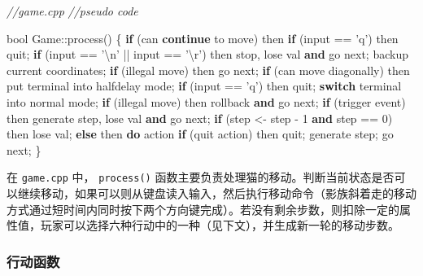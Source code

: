 \documentclass[hyperref,UTF8,a4paper]{ctexart}
\newenvironment{Shaded}{}{}
\newcommand{\CharTok}[1]{\textcolor[rgb]{0.25,0.44,0.63}{#1}}
\newcommand{\CommentTok}[1]{\textcolor[rgb]{0.38,0.63,0.69}{\textit{#1}}}
\newcommand{\ControlFlowTok}[1]{\textcolor[rgb]{0.00,0.44,0.13}{\textbf{#1}}}
\newcommand{\DataTypeTok}[1]{\textcolor[rgb]{0.56,0.13,0.00}{#1}}
\newcommand{\DecValTok}[1]{\textcolor[rgb]{0.25,0.63,0.44}{#1}}
\newcommand{\KeywordTok}[1]{\textcolor[rgb]{0.00,0.44,0.13}{\textbf{#1}}}
\newcommand{\NormalTok}[1]{#1}
\newcommand{\SpecialCharTok}[1]{\textcolor[rgb]{0.25,0.44,0.63}{#1}}
\begin{document}
\begin{Shaded}
\begin{Highlighting}[]
\CommentTok{//game.cpp}
\CommentTok{//pseudo code}

\DataTypeTok{bool}\NormalTok{ Game::process()}
\NormalTok{\{}
    \ControlFlowTok{if}\NormalTok{ (can }\ControlFlowTok{continue}\NormalTok{ to move) then}
        \ControlFlowTok{if}\NormalTok{ (input == }\CharTok{'q'}\NormalTok{) then}
\NormalTok{            quit;}
        \ControlFlowTok{if}\NormalTok{ (input == }\CharTok{'}\SpecialCharTok{\textbackslash{}n}\CharTok{'}\NormalTok{ || input == }\CharTok{'}\SpecialCharTok{\textbackslash{}r}\CharTok{'}\NormalTok{) then}
\NormalTok{            stop, lose val }\KeywordTok{and}\NormalTok{ go next;}
\NormalTok{        backup current coordinates;}
        \ControlFlowTok{if}\NormalTok{ (illegal move) then}
\NormalTok{            go next;}
        \ControlFlowTok{if}\NormalTok{ (can move diagonally) then}
\NormalTok{            put terminal into halfdelay mode;}
            \ControlFlowTok{if}\NormalTok{ (input == }\CharTok{'q'}\NormalTok{) then}
\NormalTok{                quit;}
            \ControlFlowTok{switch}\NormalTok{ terminal into normal mode;}
            \ControlFlowTok{if}\NormalTok{ (illegal move) then}
\NormalTok{                rollback }\KeywordTok{and}\NormalTok{ go next;}
        \ControlFlowTok{if}\NormalTok{ (trigger event) then}
\NormalTok{            generate step, lose val }\KeywordTok{and}\NormalTok{ go next;}
        \ControlFlowTok{if}\NormalTok{ (step <- step - }\DecValTok{1} \KeywordTok{and}\NormalTok{ step == }\DecValTok{0}\NormalTok{) then}
\NormalTok{            lose val;}
    \ControlFlowTok{else}\NormalTok{ then}
        \ControlFlowTok{do}\NormalTok{ action}
        \ControlFlowTok{if}\NormalTok{ (quit action) then}
\NormalTok{            quit;}
\NormalTok{        generate step;}
\NormalTok{    go next;}
\NormalTok{\}}
\end{Highlighting}
\end{Shaded}

在 \texttt{game.cpp} 中， \texttt{process()}
函数主要负责处理猫的移动。判断当前状态是否可以继续移动，如果可以则从键盘读入输入，然后执行移动命令（影族斜着走的移动方式通过短时间内同时按下两个方向键完成）。若没有剩余步数，则扣除一定的属性值，玩家可以选择六种行动中的一种（见下文），并生成新一轮的移动步数。

\hypertarget{ux884cux52a8ux51fdux6570}{%
\subsubsection{行动函数}\label{ux884cux52a8ux51fdux6570}}
\end{document}

